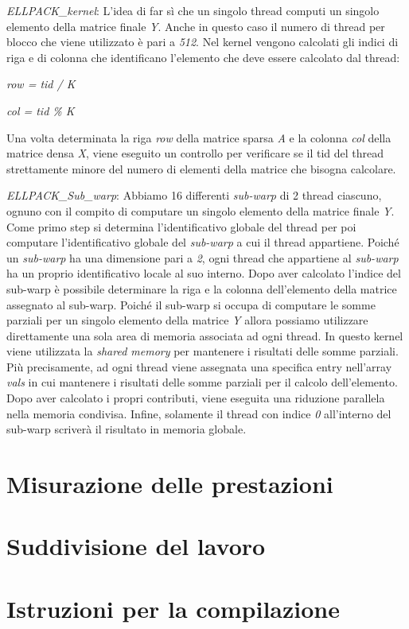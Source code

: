 \documentclass{article}
\begin{document}
\begin{itemize}

\item \textit{ELLPACK\_kernel}:
    L'idea di far sì che un singolo thread computi un singolo elemento della matrice finale \textit{Y}. Anche in questo caso il numero di thread per blocco che viene utilizzato è pari a \textit{512}.
    Nel kernel vengono calcolati gli indici di riga e di colonna che identificano l'elemento che deve essere calcolato dal thread:

    
\begin{center}
\item \textit{row = tid / K}
\item \textit{col = tid \% K}
\end{center}

    Una volta determinata la riga \textit{row} della matrice sparsa \textit{A} e la colonna \textit{col} della matrice densa \textit{X}, viene eseguito un controllo per verificare se il tid del thread strettamente minore del numero di elementi della matrice che bisogna calcolare.
    
\item \textit{ELLPACK\_Sub\_warp}:
Abbiamo 16 differenti \textit{sub-warp} di 2 thread ciascuno, ognuno con il compito di computare un singolo elemento della matrice finale \textit{Y}. Come primo step si determina l'identificativo globale del thread per poi computare l'identificativo globale del \textit{sub-warp} a cui il thread appartiene. Poiché un \textit{sub-warp} ha una dimensione pari a \textit{2}, ogni thread che appartiene al \textit{sub-warp} ha un proprio identificativo locale al suo interno. Dopo aver calcolato l'indice del sub-warp è possibile determinare la riga e la colonna dell'elemento della matrice assegnato al sub-warp. Poiché il sub-warp si occupa di computare le somme parziali per un singolo elemento della matrice \textit{Y} allora possiamo utilizzare direttamente una sola area di memoria associata ad ogni thread. In questo kernel viene utilizzata la \textit{shared memory} per mantenere i risultati delle somme parziali. Più precisamente, ad ogni thread viene assegnata una specifica entry nell'array \textit{vals} in cui mantenere i risultati delle somme parziali per il calcolo dell'elemento. Dopo aver calcolato i propri contributi, viene eseguita una riduzione parallela nella memoria condivisa. Infine, solamente il thread con indice \textit{0} all'interno del sub-warp scriverà il risultato in memoria globale.
\end{itemize}

\section{Misurazione delle prestazioni}

\section{Suddivisione del lavoro}

\section{Istruzioni per la compilazione}
\end{document}

